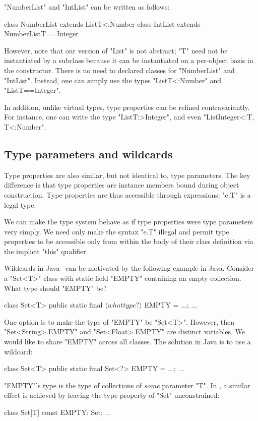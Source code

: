 \noindent
\xcd"NumberList" and \xcd"IntList" can be written as follows:
\begin{xten}
class NumberList extends List{T<:Number} { }
class IntList extends NumberList{T==Integer} { }
\end{xten}

However, note that our version of \xcd"List" is not abstract;
\xcd"T" need not be instantiated by a subclass because it can be
instantiated on a per-object basis in the constructor.
There is no
need to declared classes for \xcd"NumberList" and \xcd"IntList".
Instead, one can simply use the types
\xcd"List{T<:Number}" and \xcd"List{T==Integer}".

In addition,
unlike virtual types, type properties can be refined contravariantly.
For instance, one can write the type \xcd"List{T:>Integer}",
and even \xcd"List{Integer<:T, T<:Number}".

\subsection{Type parameters and wildcards}

Type properties are also similar, but not identical to, type
parameters.  The key difference is that type properties are
instance members bound during object construction.  Type
properties are thus accessible through expressions: \xcd"e.T" is
a legal type.

We can make the type system behave as if type properties were
type parameters very simply.  We need only make the syntax \xcd"e.T"
illegal and permit type properties to be accessible only
from within the body of their class definition via the implicit \xcd"this"
qualifier.

Wildcards in Java~\cite{Java3,adding-wildcards} can be motivated
by the following example in Java.  Consider a \xcd"Set<T>" class
with static field \xcd"EMPTY" containing an empty collection.  What
type should \xcd"EMPTY" be?
\begin{xtenmath}
class Set<T> {
  public static final $\langle what type? \rangle$ EMPTY = ...;
  ...
}
\end{xtenmath}
One option is to make the type of \xcd"EMPTY" be
\xcd"Set<T>".  However, then
\xcd"Set<String>.EMPTY"
and \xcd"Set<Float>.EMPTY" are distinct variables.  We
would like to share \xcd"EMPTY" across all classes.  The
solution in Java is to use a wildcard:
\begin{xten}
class Set<T> {
  public static final Set<?> EMPTY = ...;
  ...
}
\end{xten}
\xcd"EMPTY"'s type is the type of collections of
{\em some} parameter \xcd"T".
%
In \Xten{}, a similar effect is achieved by leaving the
type property of \xcd"Set" unconstrained:
\begin{xten}
class Set[T] {
  const EMPTY: Set;
  ...
}
\end{xten}

